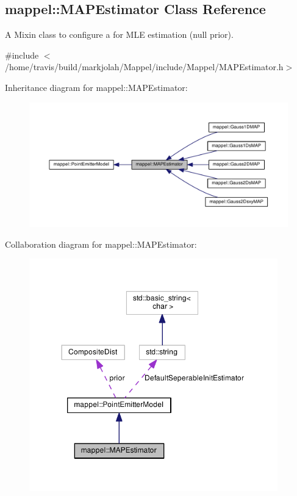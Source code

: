 \hypertarget{classmappel_1_1MAPEstimator}{}\subsection{mappel\+:\+:M\+A\+P\+Estimator Class Reference}
\label{classmappel_1_1MAPEstimator}


A Mixin class to configure a for M\+LE estimation (null prior).  




{\ttfamily \#include $<$/home/travis/build/markjolah/\+Mappel/include/\+Mappel/\+M\+A\+P\+Estimator.\+h$>$}



Inheritance diagram for mappel\+:\+:M\+A\+P\+Estimator\+:\nopagebreak
\begin{figure}[H]
\begin{center}
\leavevmode
\includegraphics[width=350pt]{classmappel_1_1MAPEstimator__inherit__graph}
\end{center}
\end{figure}


Collaboration diagram for mappel\+:\+:M\+A\+P\+Estimator\+:\nopagebreak
\begin{figure}[H]
\begin{center}
\leavevmode
\includegraphics[width=305pt]{classmappel_1_1MAPEstimator__coll__graph}
\end{center}
\end{figure}
